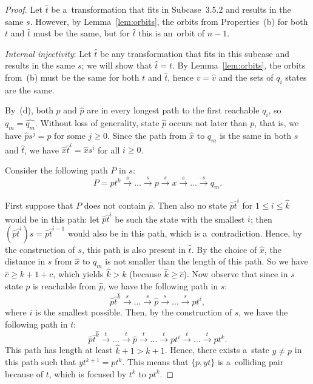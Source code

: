 \documentclass{amsart}
\renewcommand{\le}{\leqslant}
\renewcommand{\ge}{\geqslant}
\newcommand{\e}[1]{\hat{#1}}
\begin{document}
\begin{proof}
Let $\e{t}$ be a~transformation that fits in Subcase~3.5.2 and results in the same $s$.
However, by Lemma~\ref{lem:orbits}, the orbits from Properties~(b) for both $t$ and $\e{t}$ must be the same, but for $\e{t}$ this is an~orbit of $n-1$.

\textit{Internal injectivity}:
Let $\e{t}$ be any transformation that fits in this subcase and results in the same $s$; we will show that $\e{t}=t$.
By Lemma~\ref{lem:orbits}, the orbits from~(b) must be the same for both $t$ and $\e{t}$, hence $v = \e{v}$ and the sets of $q_i$ states are the same.

By~(d), both $p$ and $\e{p}$ are in every longest path to the first reachable $q_i$, so $q_m = \e{q_m}$.
Without loss of generality, state $\e{p}$ occurs not later than $p$, that is, we have $\e{p} s^j = p$ for some $j \ge 0$.
Since the path from $\e{x}$ to $q_m$ is the same in both $s$ and $\e{t}$, we have $\e{x} \e{t}^i = \e{x} s^i$ for all $i \ge 0$.

Consider the following path $P$ in $s$:
$$P = pt^k \stackrel{s}{\rightarrow} \dots \stackrel{s}{\rightarrow} p \stackrel{s}{\rightarrow} x \stackrel{s}{\rightarrow} \dots \stackrel{s}{\rightarrow} q_m.$$

First suppose that $P$ does not contain $\e{p}$.
Then also no state $\e{p} \e{t}^i$ for $1 \le i \le \e{k}$ would be in this path:
let $\e{p} \e{t}^i$ be such the state with the smallest $i$; then $(\e{p} \e{t}^i) s = \e{p} \e{t}^{i-1}$ would also be in this path, which is a~contradiction.
Hence, by the construction of $s$, this path is also present in $\e{t}$.
By the choice of $\e{x}$, the distance in $s$ from $\e{x}$ to $q_m$ is not smaller than the length of this path.
So we have $\e{c} \ge k+1+c$, which yields $\e{k} > k$ (because $\e{k} \ge \e{c}$).
Now observe that since in $s$ state $p$ is reachable from $\e{p}$, we have the following path in $s$:
$$\e{p} \e{t}^{\e{k}} \stackrel{s}{\rightarrow} \dots \stackrel{s}{\rightarrow} \e{p} \stackrel{s}{\rightarrow} \dots \stackrel{s}{\rightarrow} pt^i,$$
where $i$ is the smallest possible.
Then, by the construction of $s$, we have the following path in $t$:
$$\e{p} \e{t}^{\e{k}} \stackrel{t}{\rightarrow} \dots \stackrel{t}{\rightarrow} \e{p} \stackrel{t}{\rightarrow} \dots \stackrel{t}{\rightarrow} pt^i \stackrel{t}{\rightarrow} \dots \stackrel{t}{\rightarrow} pt^k.$$
This path has length at least $\e{k}+1 > k+1$.
Hence, there exists a~state $y \neq p$ in this path such that $y t^{k+1} = p t^k$.
This means that $\{p,yt\}$ is a~colliding pair because of $t$, which is focused by $t^k$ to $p t^k$.


\end{proof}
\end{document}
